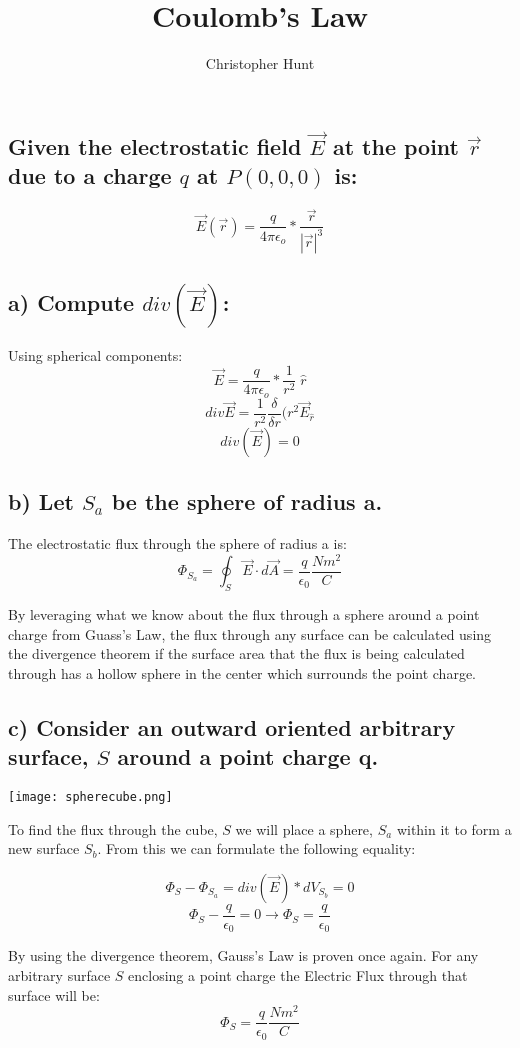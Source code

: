 \documentclass[11pt]{article}
\title{Coulomb's Law}
\author{Christopher Hunt}
\date{}
\begin{document}
\pagestyle{fancy}
\fancyhf{}
\rhead{\thepage}
\maketitle

\subsection*{Given the electrostatic field $\vec{E}$ at the point $\vec{r}$ due to a charge $q$ at $P(0,0,0)$ is:}
$$ \vec{E}(\vec{r}) = \frac{q}{4\pi \epsilon_o}*\frac{\vec{r}}{|\vec{r}|^3}$$

\subsection*{a) Compute $div(\vec{E})$:}

Using spherical components:
$$\vec{E} = \frac{q}{4\pi \epsilon_o}*\frac{1}{r^2}\; \hat{r}$$
$$div\vec{E} = \frac{1}{r^2}\frac{\delta}{\delta r}(r^2 \vec{E}_{\hat{r}}$$
$$div(\vec{E}) = 0$$

\subsection*{b) Let $S_a$ be the sphere of radius a.}

The electrostatic flux through the sphere of radius a is:
$$\Phi_{S_a} = \oint_S \vec{E} \cdot d\vec{A} = \frac{q}{\epsilon_0}\frac{N m^2}{C}$$

By leveraging what we know about the flux through a sphere around a point charge from Guass's Law, the flux through any surface can be calculated using the divergence theorem if the surface area that the flux is being calculated through has a hollow sphere in the center which surrounds the point charge.

\subsection*{c) Consider an outward oriented arbitrary surface, $S$ around a point charge q.}
\begin{center}
    \texttt{[image: spherecube.png]}
\end{center}

To find the flux through the cube, $S$ we will place a sphere, $S_a$ within it to form a new surface $S_b$. From this we can formulate the following equality:

$$\Phi_{S} - \Phi_{S_a} = div(\vec{E}) * dV_{S_b} = 0 $$
$$\Phi_S - \frac{q}{\epsilon_0} = 0 \rightarrow \Phi_S = \frac{q}{\epsilon_0}$$

By using the divergence theorem, Gauss's Law is proven once again. For any arbitrary surface $S$ enclosing a point charge the Electric Flux through that surface will be:
$$\Phi_{S} = \frac{q}{\epsilon_0}\frac{N m^2}{C}$$
\end{document}
